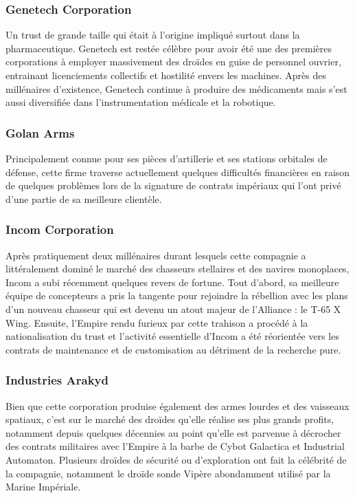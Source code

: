 \documentclass[twoside]{article}
\begin{document}
\subsubsection{Genetech Corporation}
Un trust de grande taille qui était à l'origine impliqué surtout dans la pharmaceutique. Genetech est restée célèbre pour avoir été une des premières corporations à employer massivement des droïdes en guise de personnel ouvrier, entrainant licenciements collectifs et hostilité envers les machines. Après des millénaires d'existence, Genetech continue à produire des médicaments mais s'est aussi diversifiée dans l'instrumentation médicale et la robotique.

\subsubsection{Golan Arms}
Principalement connue pour ses pièces d'artillerie et ses stations orbitales de défense, cette firme traverse actuellement quelques difficultés financières en raison de quelques problèmes lors de la signature de contrats impériaux qui l'ont privé d'une partie de sa meilleure clientèle.

\subsubsection{Incom Corporation}
Après pratiquement deux millénaires durant lesquels cette compagnie a littéralement dominé le marché des chasseurs stellaires et des navires monoplaces, Incom a subi récemment quelques revers de fortune. Tout d'abord, sa meilleure équipe de concepteurs a pris la tangente pour rejoindre la rébellion avec les plans d'un nouveau chasseur qui est devenu un atout majeur de l'Alliance : le T-65 X Wing. Ensuite, l'Empire rendu furieux par cette trahison a procédé à la nationalisation du trust et l'activité essentielle d'Incom  a été réorientée vers les contrats de maintenance et de customisation au détriment de la recherche pure.

\subsubsection{Industries Arakyd}
Bien que cette corporation produise également des armes lourdes et des vaisseaux spatiaux, c'est sur le marché des droïdes qu'elle réalise ses plus grands profits, notamment depuis quelques décennies au point qu'elle est parvenue à décrocher des contrats militaires avec l'Empire à la barbe de Cybot Galactica et Industrial Automaton. Plusieurs droïdes de sécurité ou d'exploration ont fait la célébrité de la compagnie, notamment le droïde sonde Vipère abondamment utilisé par la Marine Impériale.
\end{document}
